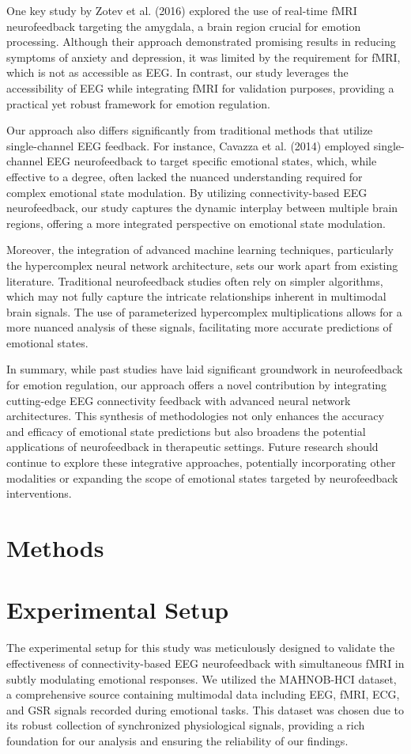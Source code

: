 \documentclass{article}
\begin{document}
One key study by Zotev et al. (2016) explored the use of real-time fMRI neurofeedback targeting the amygdala, a brain region crucial for emotion processing. Although their approach demonstrated promising results in reducing symptoms of anxiety and depression, it was limited by the requirement for fMRI, which is not as accessible as EEG. In contrast, our study leverages the accessibility of EEG while integrating fMRI for validation purposes, providing a practical yet robust framework for emotion regulation.

Our approach also differs significantly from traditional methods that utilize single-channel EEG feedback. For instance, Cavazza et al. (2014) employed single-channel EEG neurofeedback to target specific emotional states, which, while effective to a degree, often lacked the nuanced understanding required for complex emotional state modulation. By utilizing connectivity-based EEG neurofeedback, our study captures the dynamic interplay between multiple brain regions, offering a more integrated perspective on emotional state modulation.

Moreover, the integration of advanced machine learning techniques, particularly the hypercomplex neural network architecture, sets our work apart from existing literature. Traditional neurofeedback studies often rely on simpler algorithms, which may not fully capture the intricate relationships inherent in multimodal brain signals. The use of parameterized hypercomplex multiplications allows for a more nuanced analysis of these signals, facilitating more accurate predictions of emotional states.

In summary, while past studies have laid significant groundwork in neurofeedback for emotion regulation, our approach offers a novel contribution by integrating cutting-edge EEG connectivity feedback with advanced neural network architectures. This synthesis of methodologies not only enhances the accuracy and efficacy of emotional state predictions but also broadens the potential applications of neurofeedback in therapeutic settings. Future research should continue to explore these integrative approaches, potentially incorporating other modalities or expanding the scope of emotional states targeted by neurofeedback interventions.

\section{Methods}


\section{Experimental Setup}
The experimental setup for this study was meticulously designed to validate the effectiveness of connectivity-based EEG neurofeedback with simultaneous fMRI in subtly modulating emotional responses. We utilized the MAHNOB-HCI dataset, a comprehensive source containing multimodal data including EEG, fMRI, ECG, and GSR signals recorded during emotional tasks. This dataset was chosen due to its robust collection of synchronized physiological signals, providing a rich foundation for our analysis and ensuring the reliability of our findings.
\end{document}
